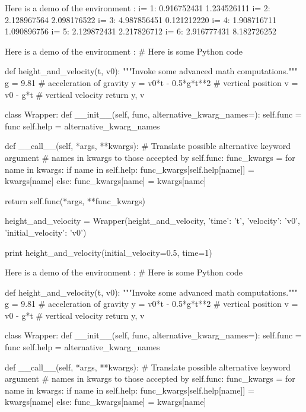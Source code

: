 \noindent
Here is a demo of the environment :
i= 1:  0.916752431  1.234526111
i= 2:  2.128967564  2.098176522
i= 3:  4.987856451  0.121212220
i= 4:  1.908716711  1.090896756
i= 5:  2.129872431  2.217826712
i= 6:  2.916777431  8.182726252

\noindent
Here is a demo of the environment :
# Here is some Python code

def height_and_velocity(t, v0):
    """Invoke some advanced math computations."""
    g = 9.81                  # acceleration of gravity
    y = v0*t - 0.5*g*t**2     # vertical position
    v = v0 - g*t              # vertical velocity
    return y, v

class Wrapper:
    def __init__(self, func, alternative_kwarg_names={}):
        self.func = func
        self.help = alternative_kwarg_names

    def __call__(self, *args, **kwargs):
        # Translate possible alternative keyword argument
        # names in kwargs to those accepted by self.func:
        func_kwargs = {}
        for name in kwargs:
            if name in self.help:
                func_kwargs[self.help[name]] = kwargs[name]
            else:
                func_kwargs[name] = kwargs[name]

        return self.func(*args, **func_kwargs)

height_and_velocity = Wrapper(height_and_velocity,
                              {'time': 't',
                               'velocity': 'v0',
                               'initial_velocity': 'v0'})

print height_and_velocity(initial_velocity=0.5, time=1)


\noindent
Here is a demo of the environment :
# Here is some Python code

def height_and_velocity(t, v0):
    """Invoke some advanced math computations."""
    g = 9.81                  # acceleration of gravity
    y = v0*t - 0.5*g*t**2     # vertical position
    v = v0 - g*t              # vertical velocity
    return y, v

class Wrapper:
    def __init__(self, func, alternative_kwarg_names={}):
        self.func = func
        self.help = alternative_kwarg_names

    def __call__(self, *args, **kwargs):
        # Translate possible alternative keyword argument
        # names in kwargs to those accepted by self.func:
        func_kwargs = {}
        for name in kwargs:
            if name in self.help:
                func_kwargs[self.help[name]] = kwargs[name]
            else:
                func_kwargs[name] = kwargs[name]

